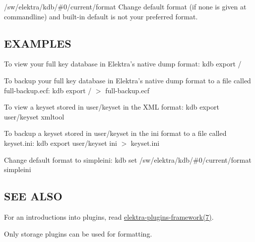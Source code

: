 \begin{DoxyItemize}
\item {\ttfamily /sw/elektra/kdb/\#0/current/format} Change default format (if none is given at commandline) and built-\/in default is not your preferred format.
\end{DoxyItemize}

\subsection*{E\+X\+A\+M\+P\+L\+E\+S}

To view your full key database in Elektra's native {\ttfamily dump} format\+: {\ttfamily kdb export /}

To backup your full key database in Elektra's native {\ttfamily dump} format to a file called {\ttfamily full-\/backup.\+ecf}\+: {\ttfamily kdb export / $>$ full-\/backup.\+ecf}

To view a keyset stored in {\ttfamily user/keyset} in the X\+M\+L format\+: {\ttfamily kdb export user/keyset xmltool}

To backup a keyset stored in {\ttfamily user/keyset} in the {\ttfamily ini} format to a file called {\ttfamily keyset.\+ini}\+: {\ttfamily kdb export user/keyset ini $>$ keyset.\+ini}

Change default format to {\ttfamily simpleini}\+: {\ttfamily kdb set /sw/elektra/kdb/\#0/current/format simpleini}

\subsection*{S\+E\+E A\+L\+S\+O}


\begin{DoxyItemize}
\item For an introductions into plugins, read \hyperlink{md_doc_help_elektra-plugins-framework_doc_help_elektra-plugins-framework_md}{elektra-\/plugins-\/framework(7)}.
\item Only storage plugins can be used for formatting. 
\end{DoxyItemize}